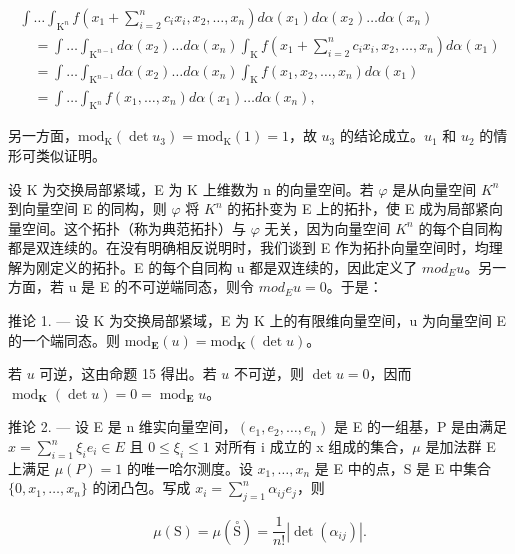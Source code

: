 \[
\begin{array}{l} \int \dots \int_ {\mathrm{K} ^ {n}} f (x _ {1} + \sum_ {i = 2} ^ {n} c _ {i} x _ {i}, x _ {2}, \ldots , x _ {n}) d \alpha (x _ {1}) d \alpha (x _ {2}) \ldots d \alpha (x _ {n}) \\ \quad = \int \dots \int_ {\mathrm{K} ^ {n - 1}} d \alpha (x _ {2}) \ldots d \alpha (x _ {n}) \int_ {\mathrm{K}} f (x _ {1} + \sum_ {i = 2} ^ {n} c _ {i} x _ {i}, x _ {2}, \ldots , x _ {n}) d \alpha (x _ {1}) \\ \quad = \int \dots \int_ {\mathrm{K} ^ {n - 1}} d \alpha (x _ {2}) \ldots d \alpha (x _ {n}) \int_ {\mathrm{K}} f (x _ {1}, x _ {2}, \ldots , x _ {n}) d \alpha (x _ {1}) \\ \quad = \int \dots \int_ {\mathrm{K} ^ {n}} f (x _ {1}, \ldots , x _ {n}) d \alpha (x _ {1}) \ldots d \alpha (x _ {n}), \end{array}
\]

另一方面，\(\mathrm{mod}_{\mathrm{K}}(\det u_{3})=\mathrm{mod}_{\mathrm{K}}(1)=1\)，故 \(u_{3}\) 的结论成立。\(u_{1}\) 和 \(u_{2}\) 的情形可类似证明。

设 K 为交换局部紧域，E 为 K 上维数为 n 的向量空间。若 \(\varphi\) 是从向量空间 \(K^{n}\) 到向量空间 E 的同构，则 \(\varphi\) 将 \(K^{n}\) 的拓扑变为 E 上的拓扑，使 E 成为局部紧向量空间。这个拓扑（称为典范拓扑）与 \(\varphi\) 无关，因为向量空间 \(K^{n}\) 的每个自同构都是双连续的。在没有明确相反说明时，我们谈到 E 作为拓扑向量空间时，均理解为刚定义的拓扑。E 的每个自同构 u 都是双连续的，因此定义了 \(mod_{E}u\)。另一方面，若 u 是 E 的不可逆端同态，则令 \(mod_{E}u = 0\)。于是：

推论 1. --- 设 K 为交换局部紧域，E 为 K 上的有限维向量空间，u 为向量空间 E 的一个端同态。则 \(\text{mod}_{\mathbf{E}}(u) = \text{mod}_{\mathbf{K}}(\det u)\)。

若 \(u\) 可逆，这由命题 15 得出。若 \(u\) 不可逆，则 \(\det u = 0\)，因而 \(\operatorname{mod}_{\mathbf{K}}(\det u) = 0 = \operatorname{mod}_{\mathbf{E}}u\)。

推论 2. --- 设 E 是 n 维实向量空间，\((e_{1}, e_{2}, \ldots, e_{n})\) 是 E 的一组基，P 是由满足 \(x = \sum_{i=1}^{n} \xi_{i} e_{i} \in E\) 且 \(0 \leqslant \xi_{i} \leqslant 1\) 对所有 i 成立的 x 组成的集合，\(\mu\) 是加法群 E 上满足 \(\mu(P) = 1\) 的唯一哈尔测度。设 \(x_{1}, \ldots, x_{n}\) 是 E 中的点，S 是 E 中集合 \(\{0, x_{1}, \ldots, x_{n}\}\) 的闭凸包。写成 \(x_{i} = \sum_{j=1}^{n} \alpha_{ij} e_{j}\)，则

\[
\mu (\mathrm{S}) = \mu (\stackrel {\circ} {\mathrm{S}}) = \frac {1}{n !} | \det (\alpha_ {i j}) |.
\]

